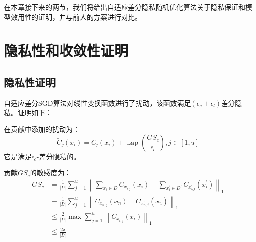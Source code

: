 在本章接下来的两节，我们将给出自适应差分隐私随机优化算法关于隐私保证和模型效用性的证明，并与前人的方案进行对比。

\section{隐私性和收敛性证明}

\subsection{隐私性证明}
自适应差分SGD算法对线性变换函数进行了扰动，该函数满足$\left(\epsilon_{c}+\epsilon_{l}\right)$差分隐私。证明如下：

在贡献中添加的扰动为：
\begin{equation}\label{eq:贡献中添加的噪声}
\ddot{C}_{j}\left(x_{i}\right)=C_{j}\left(x_{i}\right)+\operatorname{Lap}\left(\frac{G S_{c}}{\epsilon_{c}}\right), j \in[1, u]
\end{equation}
它是满足$\epsilon_{c}$-差分隐私的。

贡献$G S_{c}$的敏感度为：
\begin{equation}\label{eq:贡献敏感度}
\begin{aligned}
G S_{c} &=\frac{1}{|D|} \sum_{j=1}^{u}\left\|\sum_{x_{i} \in D} C_{x_{i, j}}\left(x_{i}\right)-\sum_{x_{i}^{\prime} \in D^{\prime}} C_{x_{i, j}^{\prime}}\left(x_{i}^{\prime}\right)\right\|_{1} \\
&=\frac{1}{|D|} \sum_{j=1}^{u}\left\|C_{x_{n, j}}\left(x_{n}\right)-C_{x_{n, j}^{\prime}}\left(x_{n}^{\prime}\right)\right\|_{1} \\
& \leq \frac{2}{|D|} \max \sum_{j=1}^{u}\left\|C_{x_{i, j}}\left(x_{i}\right)\right\|_{1} \\
& \leq \frac{2 u}{|D|}
\end{aligned}
\end{equation}

